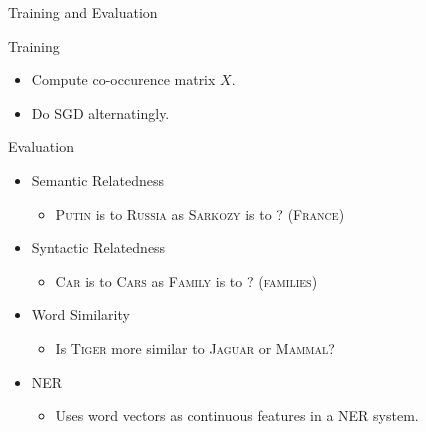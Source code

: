\begin{frame}{Training and Evaluation}

  \begin{exampleblock}{Training}
    \begin{itemize}[<+->]
    \item Compute co-occurence matrix $X$.
    \item Do SGD alternatingly.
    \end{itemize}
  \end{exampleblock}
  
  \begin{alertblock}{Evaluation}
    \begin{itemize}[<+->]
    \item Semantic Relatedness %
      \begin{itemize}
      \item \textsc{Putin} is to \textsc{Russia} as \textsc{Sarkozy} is to ? (\textsc{France})
      \end{itemize}
    \item Syntactic Relatedness %
      \begin{itemize}
      \item \textsc{Car} is to \textsc{Cars} as \textsc{Family} is to ? (\textsc{families})
      \end{itemize}
    \item Word Similarity
      \begin{itemize}
      \item Is \textsc{Tiger} more similar to \textsc{Jaguar} or \textsc{Mammal}?
        \end{itemize}
    \item NER 
      \begin{itemize}
      \item Uses word vectors as continuous features in a NER system.
      \end{itemize}
    \end{itemize}
  \end{alertblock}
\end{frame}

